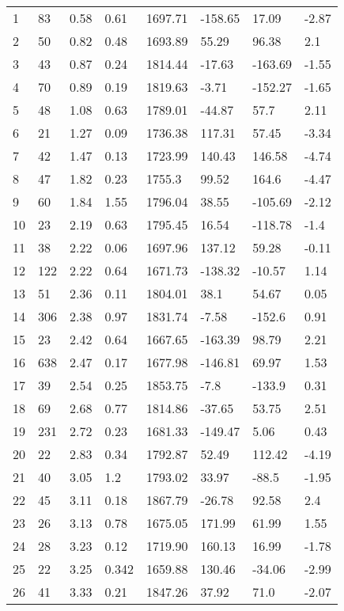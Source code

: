 \documentclass[twocolumn]{aastex631}
\begin{document}
\begin{center}
\begin{longtable}{|l|l|l|l|l|l|l|l|}
1 & 83   &0.58  &0.61 & 1697.71 &-158.65 &17.09  & -2.87 \\
2 & 50   &0.82  &0.48 & 1693.89 &55.29   &96.38   & 2.1   \\
3 & 43   &0.87  &0.24 & 1814.44 &-17.63  &-163.69& -1.55 \\
4 & 70   &0.89  &0.19 & 1819.63 &-3.71   &-152.27 & -1.65 \\
5 & 48   &1.08  &0.63 & 1789.01 &-44.87  &57.7   & 2.11  \\
6 & 21   &1.27  &0.09 & 1736.38 &117.31  &57.45  & -3.34 \\
7 & 42   &1.47  &0.13 & 1723.99 &140.43  &146.58  & -4.74 \\
8 & 47   &1.82  &0.23 & 1755.3  &99.52   &164.6  & -4.47 \\
9 & 60   &1.84  &1.55 & 1796.04 &38.55   &-105.69 & -2.12 \\
10&  23  & 2.19 & 0.63 & 1795.45& 16.54  & -118.78&  -1.4 \\ 
11&  38  & 2.22 & 0.06 & 1697.96& 137.12 & 59.28 &  -0.11\\ 
12&  122 & 2.22 & 0.64 & 1671.73& -138.32& -10.57&  1.14 \\ 
13&  51  & 2.36 & 0.11 & 1804.01& 38.1   & 54.67 &  0.05 \\ 
14&  306 & 2.38 & 0.97 & 1831.74& -7.58  & -152.6&  0.91 \\ 
15&  23  & 2.42 & 0.64 & 1667.65& -163.39& 98.79 &  2.21 \\ 
16&  638 & 2.47 & 0.17 & 1677.98& -146.81& 69.97 &  1.53 \\ 
17&  39 & 2.54 & 0.25 & 1853.75& -7.8   & -133.9 &  0.31 \\ 
18&  69  & 2.68 & 0.77 & 1814.86& -37.65 & 53.75 &  2.51 \\ 
19&  231 & 2.72 & 0.23 & 1681.33& -149.47& 5.06  &  0.43 \\ 
20&  22  & 2.83 & 0.34 & 1792.87& 52.49  & 112.42&  -4.19\\ 
21&  40  & 3.05 & 1.2  & 1793.02& 33.97  & -88.5  &  -1.95\\ 
22&  45  & 3.11 & 0.18 & 1867.79& -26.78 & 92.58 &  2.4  \\ 
23&  26  & 3.13 & 0.78 & 1675.05& 171.99 & 61.99 &  1.55 \\ 
24&  28  & 3.23 & 0.12 & 1719.90 & 160.13&  16.99&  -1.78\\ 
25&  22 & 3.25 & 0.342& 1659.88& 130.46 & -34.06 &  -2.99\\ 
26&  41  & 3.33 & 0.21 & 1847.26& 37.92  & 71.0  &  -2.07\\ 

\end{longtable}
\end{center}
\end{document}

